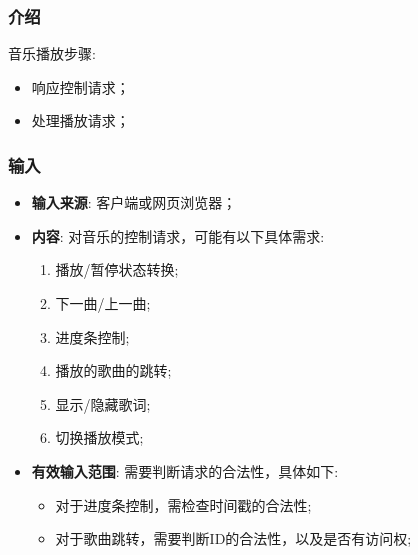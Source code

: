 \subsubsection{介绍}
	音乐播放步骤: 
	\begin{itemize}
		\item 响应控制请求；
		\item 处理播放请求；
	\end{itemize}
\subsubsection{输入}
	\begin{itemize}
		\item \textbf{输入来源}: 客户端或网页浏览器；
		\item \textbf{内容}: 对音乐的控制请求，可能有以下具体需求: 
		\begin{enumerate}
			\item 播放/暂停状态转换;
			\item 下一曲/上一曲;
			\item 进度条控制;
			\item 播放的歌曲的跳转;
			\item 显示/隐藏歌词;
			\item 切换播放模式;
		\end{enumerate}
		\item \textbf{有效输入范围}: 需要判断请求的合法性，具体如下: 
		\begin{itemize}
			\item 对于进度条控制，需检查时间戳的合法性;
			\item 对于歌曲跳转，需要判断ID的合法性，以及是否有访问权;
		\end{itemize}
	\end{itemize}

